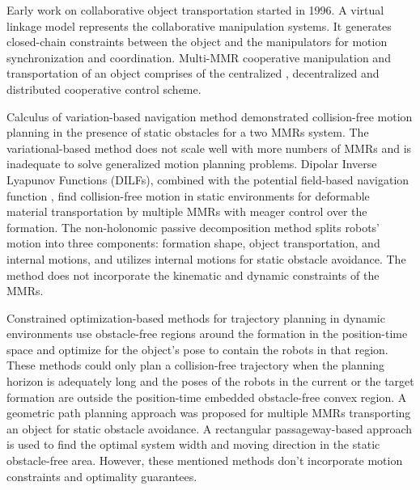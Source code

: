 Early work on collaborative object transportation started in 1996. A virtual linkage model \cite{1996_khatib} represents the collaborative manipulation systems. It generates closed-chain constraints \cite{2023_Xu} between the object and the manipulators for motion synchronization and coordination. Multi-MMR cooperative manipulation and transportation of an object comprises of the centralized \cite{2013_Erhart}, decentralized \cite{2016_Petitti,2018_Culbertson,2018_Verginis} and distributed \cite{2017_Dai,2018_Marino,2020_Ren} cooperative control scheme.

Calculus of variation-based navigation method \cite{1997_Desai} demonstrated collision-free motion planning in the presence of static obstacles for a two MMRs system. The variational-based method does not scale well with more numbers of MMRs and is inadequate to solve generalized motion planning problems. Dipolar Inverse Lyapunov Functions (DILFs), combined with the potential field-based navigation function \cite{2003_Tanner}, find collision-free motion in static environments for deformable material transportation by multiple MMRs with meager control over the formation. The non-holonomic passive decomposition method \cite{2013_Yang} splits robots' motion into three components: formation shape, object transportation, and internal motions, and utilizes internal motions for static obstacle avoidance. The method does not incorporate the kinematic and dynamic constraints of the MMRs.

Constrained optimization-based methods \cite{2015a_AlonsoMora,2015b_AlonsoMora,2017_AlonsoMora} for trajectory planning in dynamic environments use obstacle-free regions around the formation in the position-time space and optimize for the object's pose to contain the robots in that region. These methods could only plan a collision-free trajectory when the planning horizon is adequately long and the poses of the robots in the current or the target formation are outside the position-time embedded obstacle-free convex region. A geometric path planning approach was proposed \cite{2018_Cao, 2017_Jiao} for multiple MMRs transporting an object for static obstacle avoidance. A rectangular passageway-based approach \cite{2018_Cao} is used to find the optimal system width and moving direction in the static obstacle-free area. However, these mentioned methods don't incorporate motion constraints and optimality guarantees.

